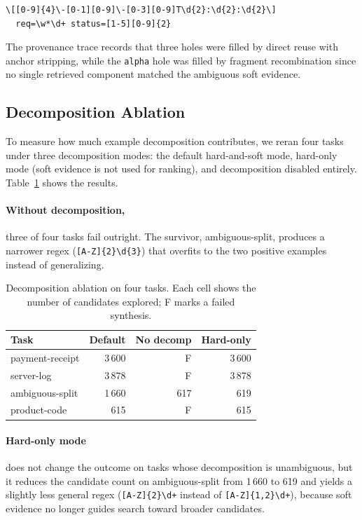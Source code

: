 \documentclass[sigconf,nonacm]{acmart}
\begin{document}
\begin{lstlisting}
\[[0-9]{4}\-[0-1][0-9]\-[0-3][0-9]T\d{2}:\d{2}:\d{2}\]
  req=\w*\d+ status=[1-5][0-9]{2}
\end{lstlisting}

\noindent The provenance trace records that three holes were filled by direct
reuse with anchor stripping, while the \texttt{alpha} hole was filled by
fragment recombination since no single retrieved component matched the
ambiguous soft evidence.

\subsection{Decomposition Ablation}
To measure how much example decomposition contributes, we reran four tasks
under three decomposition modes: the default hard-and-soft mode, hard-only
mode (soft evidence is not used for ranking), and decomposition disabled
entirely. Table~\ref{tab:ablation} shows the results.

\paragraph{Without decomposition,} three of four tasks fail outright. The
survivor, ambiguous-split, produces a narrower regex
(\texttt{[A-Z]\{2\}\textbackslash d\{3\}}) that overfits to the two positive
examples instead of generalizing.

\begin{table}[H]
  \caption{Decomposition ablation on four tasks.  Each cell shows the
    number of candidates explored; \textsf{F} marks a failed synthesis.}
  \label{tab:ablation}
  \centering
  \footnotesize
  \begin{tabular*}{\columnwidth}{@{\extracolsep{\fill}}lrrr@{}}
    \toprule
    Task & Default & No decomp & Hard-only \\
    \midrule
    payment-receipt  & 3\,600  & \textsf{F} & 3\,600 \\
    server-log       & 3\,878  & \textsf{F} & 3\,878 \\
    ambiguous-split  & 1\,660  &   617      &   619  \\
    product-code     &   615   & \textsf{F} &   615  \\
    \bottomrule
  \end{tabular*}
\end{table}

\paragraph{Hard-only mode} does not change the outcome on tasks whose
decomposition is unambiguous, but it reduces the candidate count on
ambiguous-split from 1\,660 to 619 and yields a slightly less general regex
(\texttt{[A-Z]\{2\}\textbackslash d+} instead of
\texttt{[A-Z]\{1,2\}\textbackslash d+}), because soft evidence no longer
guides search toward broader candidates.
\end{document}
